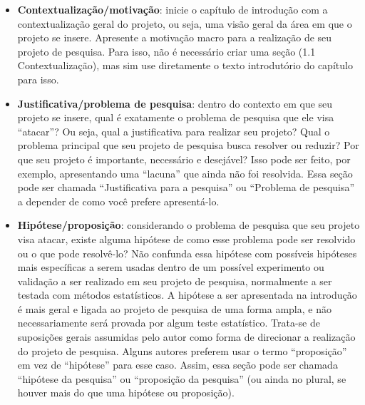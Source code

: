 \documentclass[
	12pt,				%
	oneside,			%
	a4paper,			%
	english,			%
	brazil				%
	]{abntex2ppgsi}
\begin{document}
\begin{itemize}
	\item \textbf{Contextualização/motivação}: inicie o capítulo de introdução com a contextualização geral do projeto, ou seja, uma visão geral da área em que o projeto se insere. Apresente a motivação macro para a realização de seu projeto de pesquisa. Para isso, não é necessário criar uma seção (1.1 Contextualização), mas sim use diretamente o texto introdutório do capítulo para isso.
	\item \textbf{Justificativa/problema de pesquisa}: dentro do contexto em que seu projeto se insere, qual é exatamente o problema de pesquisa que ele visa ``atacar''? Ou seja, qual a justificativa para realizar seu projeto? Qual o problema principal que seu projeto de pesquisa busca resolver ou reduzir? Por que seu projeto é importante, necessário e desejável? Isso pode ser feito, por exemplo, apresentando uma ``lacuna'' que ainda não foi resolvida. Essa seção pode ser chamada ``Justificativa para a pesquisa'' ou ``Problema de pesquisa'' a depender de como você prefere apresentá-lo.
	\item \textbf{Hipótese/proposição}: considerando o problema de pesquisa que seu projeto visa atacar, existe alguma hipótese de como esse problema pode ser resolvido ou o que pode resolvê-lo? Não confunda essa hipótese com possíveis hipóteses mais específicas a serem usadas dentro de um possível experimento ou validação a ser realizado em seu projeto de pesquisa, normalmente a ser testada com métodos estatísticos. A hipótese a ser apresentada na introdução é mais geral e ligada ao projeto de pesquisa de uma forma ampla, e não necessariamente será provada por algum teste estatístico. Trata-se de suposições gerais assumidas pelo autor como forma de direcionar a realização do projeto de pesquisa. Alguns autores preferem usar o termo ``proposição'' em vez de ``hipótese'' para esse caso.  Assim, essa seção pode ser chamada ``hipótese da pesquisa'' ou ``proposição da pesquisa'' (ou ainda no plural, se houver mais do que uma hipótese ou proposição).

\end{itemize}
\end{document}

